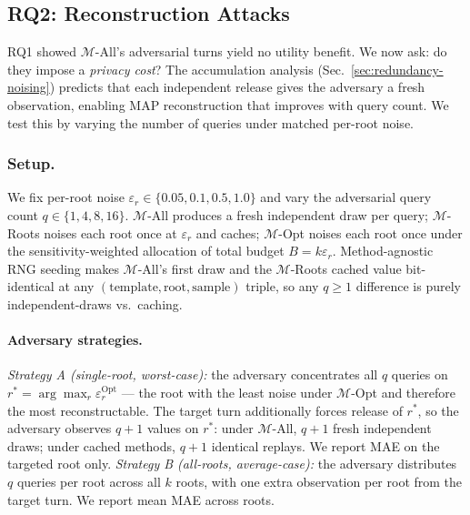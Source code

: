 \subsection{RQ2: Reconstruction Attacks}
\label{sec:experiments-rq2}

RQ1 showed $\mathcal{M}$-All's adversarial turns yield no utility benefit. We now ask: do they impose a \emph{privacy cost}? The accumulation analysis (Sec.~\ref{sec:redundancy-noising}) predicts that each independent release gives the adversary a fresh observation, enabling MAP reconstruction that improves with query count. We test this by varying the number of queries under matched per-root noise.


\subsubsection{Setup.}
We fix per-root noise $\varepsilon_r \in \{0.05, 0.1, 0.5, 1.0\}$ and vary the adversarial query count $q \in \{1, 4, 8, 16\}$. $\mathcal{M}$-All produces a fresh independent draw per query; $\mathcal{M}$-Roots noises each root once at $\varepsilon_r$ and caches; $\mathcal{M}$-Opt noises each root once under the sensitivity-weighted allocation of total budget $B = k\varepsilon_r$. Method-agnostic RNG seeding makes $\mathcal{M}$-All's first draw and the $\mathcal{M}$-Roots cached value bit-identical at any $(\text{template}, \text{root}, \text{sample})$ triple, so any $q \geq 1$ difference is purely independent-draws vs.\ caching.

\paragraph{Adversary strategies.} \emph{Strategy A (single-root, worst-case):} the adversary concentrates all $q$ queries on $r^* = \arg\max_r \varepsilon_r^{\mathrm{Opt}}$ --- the root with the least noise under $\mathcal{M}$-Opt and therefore the most reconstructable. The target turn additionally forces release of $r^*$, so the adversary observes $q{+}1$ values on $r^*$: under $\mathcal{M}$-All, $q{+}1$ fresh independent draws; under cached methods, $q{+}1$ identical replays. We report MAE on the targeted root only. \emph{Strategy B (all-roots, average-case):} the adversary distributes $q$ queries per root across all $k$ roots, with one extra observation per root from the target turn. We report mean MAE across roots.

